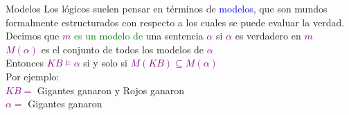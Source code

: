 
\begin{frame}{Modelos}
	Los lógicos suelen pensar en términos de \textcolor{blue}{modelos},
	que son mundos formalmente estructurados con respecto a los cuales se
	puede evaluar la verdad.\\[0.3cm]

	Decimos que \textcolor{Purple}{$m$} \textcolor{Green}{es un modelo de} 
	una sentencia \textcolor{Purple}{$\alpha$} si \textcolor{Purple}{$\alpha$} es
	verdadero en \textcolor{Purple}{$m$}\\[0.3cm]

	\textcolor{Purple}{$M(\alpha)$} es el conjunto de todos los modelos de
	\textcolor{Purple}{$\alpha$}\\[0.3cm]

	Entonces \textcolor{Purple}{$KB \models \alpha$} si y solo si
	\textcolor{Purple}{$M(KB) \subseteq M(\alpha)$}\\[0.3cm]

	Por ejemplo:\\[0.3cm]

	\textcolor{Purple}{$KB =$} Gigantes ganaron y Rojos ganaron\\
	\textcolor{Purple}{$\alpha =$} Gigantes ganaron
\end{frame}{}
